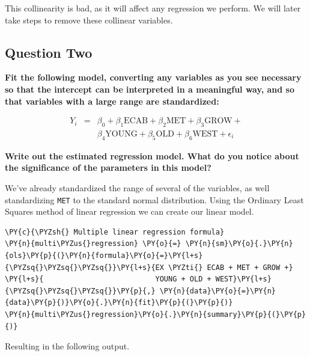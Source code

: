 \documentclass[10pt]{article}\usepackage[]{graphicx}\usepackage[]{xcolor}
\begin{document}
This collinearity is bad, as it will affect any regression we perform.
We will later take steps to remove these collinear variables.

    \subsection*{Question Two}
    \textbf{Fit the following model, converting any variables as you see necessary so that the intercept can be
    interpreted in a meaningful way, and so that variables with a large range are standardized:}

    \begin{equation*}
        \begin{aligned}
            Y_i &=& \beta_0 +
                    \beta_1 \text{ECAB} +
                    \beta_2 \text{MET} +
                    \beta_3 \text{GROW} +\\
                    &&\beta_4 \text{YOUNG} +
                    \beta_5 \text{OLD} +
                    \beta_6 \text{WEST} +
                    \epsilon_i
        \end{aligned}
    \end{equation*}

    \textbf{Write out the estimated regression model. What do you notice about the significance of the parameters in
    this model?}\newline

    We've already standardized the range of several of the variables, as well standardizing \texttt{MET} to the standard
    normal distribution.  Using the Ordinary Least Squares method of linear regression we can create our linear model.

    \begin{Verbatim}[commandchars=\\\{\}]
\PY{c}{\PYZsh{} Multiple linear regression formula}
\PY{n}{multi\PYZus{}regression} \PY{o}{=} \PY{n}{sm}\PY{o}{.}\PY{n}{ols}\PY{p}{(}\PY{n}{formula}\PY{o}{=}\PY{l+s}{\PYZsq{}\PYZsq{}\PYZsq{}}\PY{l+s}{EX \PYZti{} ECAB + MET + GROW +}
\PY{l+s}{                          YOUNG + OLD + WEST}\PY{l+s}{\PYZsq{}\PYZsq{}\PYZsq{}}\PY{p}{,} \PY{n}{data}\PY{o}{=}\PY{n}{data}\PY{p}{)}\PY{o}{.}\PY{n}{fit}\PY{p}{(}\PY{p}{)}
\PY{n}{multi\PYZus{}regression}\PY{o}{.}\PY{n}{summary}\PY{p}{(}\PY{p}{)}
\end{Verbatim}

Resulting in the following output.
\end{document}
